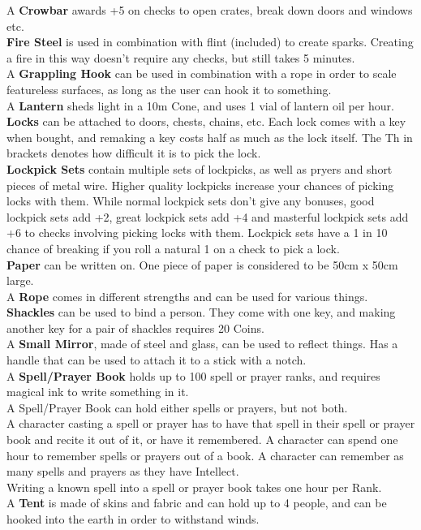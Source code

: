 A \textbf{Crowbar} awards +5 on checks to open crates, break down doors and windows etc.\\

\textbf{Fire Steel} is used in combination with flint (included) to create sparks.
Creating a fire in this way doesn't require any checks, but still takes 5 minutes.\\

A \textbf{Grappling Hook} can be used in combination with a rope in order to scale featureless surfaces, as long as the user can hook it to something.\\

A \textbf{Lantern} sheds light in a 10m Cone, and uses 1 vial of lantern oil per hour.\\

\textbf{Locks} can be attached to doors, chests, chains, etc.
Each lock comes with a key when bought, and remaking a key costs half as much as the lock itself.
The Th in brackets denotes how difficult it is to pick the lock.\\

\textbf{Lockpick Sets} contain multiple sets of lockpicks, as well as pryers and short pieces of metal wire.
Higher quality lockpicks increase your chances of picking locks with them.
While normal lockpick sets don't give any bonuses, good lockpick sets add +2, great lockpick sets add +4 and masterful lockpick sets add +6 to checks involving picking locks with them.
Lockpick sets have a 1 in 10 chance of breaking if you roll a natural 1 on a check to pick a lock.\\

\textbf{Paper} can be written on.
One piece of paper is considered to be 50cm x 50cm large.\\

A \textbf{Rope} comes in different strengths and can be used for various things.\\

\textbf{Shackles} can be used to bind a person.
They come with one key, and making another key for a pair of shackles requires 20 Coins.\\

A \textbf{Small Mirror}, made of steel and glass, can be used to reflect things.
Has a handle that can be used to attach it to a stick with a notch.\\

A \textbf{Spell/Prayer Book} holds up to 100 spell or prayer ranks, and requires magical ink to write something in it.\\
A Spell/Prayer Book can hold either spells or prayers, but not both.\\
A character casting a spell or prayer has to have that spell in their spell or prayer book and recite it out of it, or have it remembered.
A character can spend one hour to remember spells or prayers out of a book.
A character can remember as many spells and prayers as they have Intellect.\\
Writing a known spell into a spell or prayer book takes one hour per Rank.\\

A \textbf{Tent} is made of skins and fabric and can hold up to 4 people, and can be hooked into the earth in order to withstand winds.\\